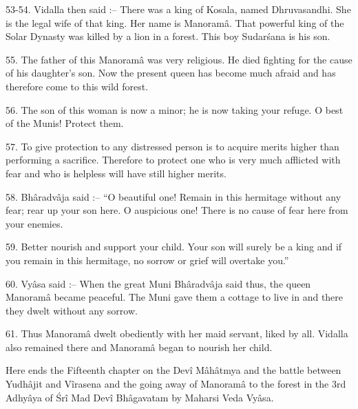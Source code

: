 53-54. Vidalla then said :-- There was a king of Kosala, named Dhruvasandhi. She is the legal wife of that king. Her name is Manoram\^a. That powerful king of the Solar Dynasty was killed by a lion in a forest. This boy Sudar\'sana is his son.

55. The father of this Manoram\^a was very religious. He died fighting for the cause of his daughter's son. Now the present queen has become much afraid and has therefore come to this wild forest.

56. The son of this woman is now a minor; he is now taking your refuge. O best of the Munis! Protect them.

57. To give protection to any distressed person is to acquire merits higher than performing a sacrifice. Therefore to protect one who is very much afflicted with fear and who is helpless will have still higher merits.

58. Bh\^aradv\^aja said :-- ``O beautiful one! Remain in this hermitage without any fear; rear up your son here. O auspicious one! There is no cause of fear here from your enemies.

59. Better nourish and support your child. Your son will surely be a king and if you remain in this hermitage, no sorrow or grief will overtake you.''

60. Vy\^asa said :-- When the great Muni Bh\^aradv\^aja said thus, the queen Manoram\^a became peaceful. The Muni gave them a cottage to live in and there they dwelt without any sorrow.

61. Thus Manoram\^a dwelt obediently with her maid servant, liked by all. Vidalla also remained there and Manoram\^a began to nourish her child.

Here ends the Fifteenth chapter on the Dev\^i M\^ah\^atmya and the battle between Yudh\^ajit and V\^irasena and the going away of Manoram\^a to the forest in the 3rd Adhy\^aya of \'Sr\^i Mad Dev\^i Bh\^agavatam by Maharsi Veda Vy\^asa.